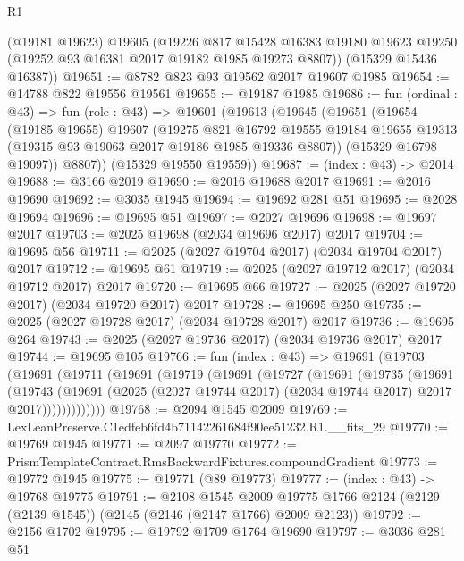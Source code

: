 \begin{lexlean}{R1}
\begin{coremodule}
      (@19181 @19623)
      @19605
      (@19226
        @817
        @15428
        @16383
        @19180
        @19623
        @19250
        (@19252 @93 @16381 @2017 @19182 @1985 @19273 @8807))
      (@15329 @15436 @16387))
@19651 := @8782 @823 @93 @19562 @2017 @19607 @1985
@19654 := @14788 @822 @19556 @19561
@19655 := @19187 @1985
@19686 := fun (ordinal : @43) =>
  fun (role : @43) =>
  @19601
    (@19613
      (@19645
        (@19651
          (@19654
            (@19185 @19655)
            @19607
            (@19275
              @821
              @16792
              @19555
              @19184
              @19655
              @19313
              (@19315 @93 @19063 @2017 @19186 @1985 @19336 @8807))
            (@15329 @16798 @19097))
          @8807))
      (@15329 @19550 @19559))
@19687 := (index : @43) -> @2014
@19688 := @3166 @2019
@19690 := @2016 @19688 @2017
@19691 := @2016 @19690
@19692 := @3035 @1945
@19694 := @19692 @281 @51
@19695 := @2028 @19694
@19696 := @19695 @51
@19697 := @2027 @19696
@19698 := @19697 @2017
@19703 := @2025 @19698 (@2034 @19696 @2017) @2017
@19704 := @19695 @56
@19711 := @2025 (@2027 @19704 @2017) (@2034 @19704 @2017) @2017
@19712 := @19695 @61
@19719 := @2025 (@2027 @19712 @2017) (@2034 @19712 @2017) @2017
@19720 := @19695 @66
@19727 := @2025 (@2027 @19720 @2017) (@2034 @19720 @2017) @2017
@19728 := @19695 @250
@19735 := @2025 (@2027 @19728 @2017) (@2034 @19728 @2017) @2017
@19736 := @19695 @264
@19743 := @2025 (@2027 @19736 @2017) (@2034 @19736 @2017) @2017
@19744 := @19695 @105
@19766 := fun (index : @43) =>
  @19691
    (@19703
      (@19691
        (@19711
          (@19691
            (@19719
              (@19691
                (@19727
                  (@19691
                    (@19735
                      (@19691
                        (@19743
                          (@19691
                            (@2025
                              (@2027 @19744 @2017)
                              (@2034 @19744 @2017)
                              @2017
                              @2017)))))))))))))
@19768 := @2094 @1545 @2009
@19769 := LexLeanPreserve.C1edfeb6fd4b71142261684f90ee51232.R1.__fits_29
@19770 := @19769 @1945
@19771 := @2097 @19770
@19772 := PrismTemplateContract.RmsBackwardFixtures.compoundGradient
@19773 := @19772 @1945
@19775 := @19771 (@89 @19773)
@19777 := (index : @43) -> @19768 @19775
@19791 := @2108
    @1545
    @2009
    @19775
    @1766
    @2124
    (@2129 (@2139 @1545))
    (@2145 (@2146 (@2147 @1766) @2009 @2123))
@19792 := @2156 @1702
@19795 := @19792 @1709 @1764 @19690
@19797 := @3036 @281 @51

\end{coremodule}
\end{lexlean}
